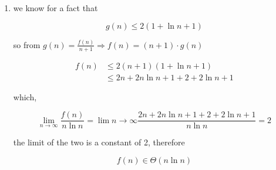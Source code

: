 \documentclass{article}
\theoremstyle{remark}
\begin{document}
\begin{enumerate}[label=(\roman*)]
        \[\boxed{g(n) = \sum_{i=0}^n \frac{2}{n+1}}\]

        and as we're given a \textbf{fact} that

        \[H_n \le 1 + \ln{n}\]

        we got

        \[\boxed{g(n) = 2H_{n+1}}\]


    \medskip
    \begin{center}
    \rule{0.3\linewidth}{0.2pt}
    \end{center}
    \medskip


    \item we know for a fact that

        \[g(n) \le 2(1 + \ln{n+1})\]

        so from $g(n) = \frac{f(n)}{n+1} \Rightarrow f(n) = (n+1)\cdot g(n)$

        \begin{align*}
            f(n) &\le 2(n+1)(1 + \ln{n+1}) \\
            &\le 2n + 2n\ln{n+1} + 2 + 2\ln{n+1}
        \end{align*}

        which, 

        \[\lim_{n\rightarrow\infty} \frac{f(n)}{n\ln{n}} = \lim{n\rightarrow\infty} \frac{2n + 2n\ln{n+1} + 2 + 2\ln{n+1}}{n\ln{n}} = 2\]

        the limit of the two is a constant of 2, therefore

        \[\boxed{f(n) \in \Theta(n\ln{n})}\]
\end{enumerate}
\end{document}
